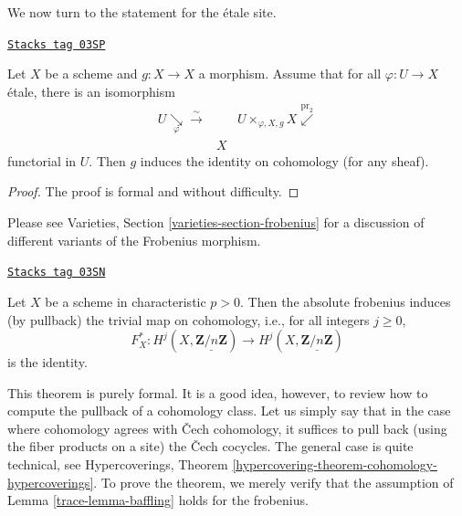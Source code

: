 We now turn to the statement for the \'etale site.

\begin{lemma}[Baffling]
\label{trace-lemma-baffling}
\href{https://stacks.math.columbia.edu/tag/03SP}{\texttt{Stacks tag 03SP}}

Let $X$ be a scheme and $g : X \to X$ a morphism. Assume that for all
$\varphi : U \to X$ \'etale, there is an isomorphism
$$
\begin{array}{ccc}U \underset{\varphi}{\searrow}\overset{\sim}{\longrightarrow} &  & {U
\times_{\varphi, X, g} X} \overset{\text{pr}_2}{\swarrow} \\  & X & \end{array}
$$
functorial in $U$. Then $g$ induces the identity on cohomology (for any sheaf).
\end{lemma}

\begin{proof}
The proof is formal and without difficulty.
\end{proof}

Please see Varieties, Section \ref{varieties-section-frobenius}
for a discussion of different variants of the Frobenius morphism.

\begin{theorem}

\label{trace-theorem-baffling}
\href{https://stacks.math.columbia.edu/tag/03SN}{\texttt{Stacks tag 03SN}}

Let $X$ be a scheme in characteristic $p > 0$. Then the absolute frobenius
induces (by pullback) the trivial map on cohomology, i.e., for all
integers $j\geq 0$,
$$
F_X^* : H^j (X, \underline{\mathbf{Z}/n\mathbf{Z}}) \longrightarrow H^j (X,
\underline{\mathbf{Z}/n\mathbf{Z}})
$$
is the identity.
\end{theorem}

This theorem is purely formal. It is a good idea, however, to review how to
compute the pullback of a cohomology class. Let us simply say that in the case
where cohomology agrees with {\v C}ech cohomology, it suffices to pull back
(using the fiber products on a site) the {\v C}ech cocycles. The general case is
quite technical, see
Hypercoverings, Theorem \ref{hypercovering-theorem-cohomology-hypercoverings}.
To prove the theorem, we merely
verify that the assumption of Lemma \ref{trace-lemma-baffling}
holds for the frobenius.

